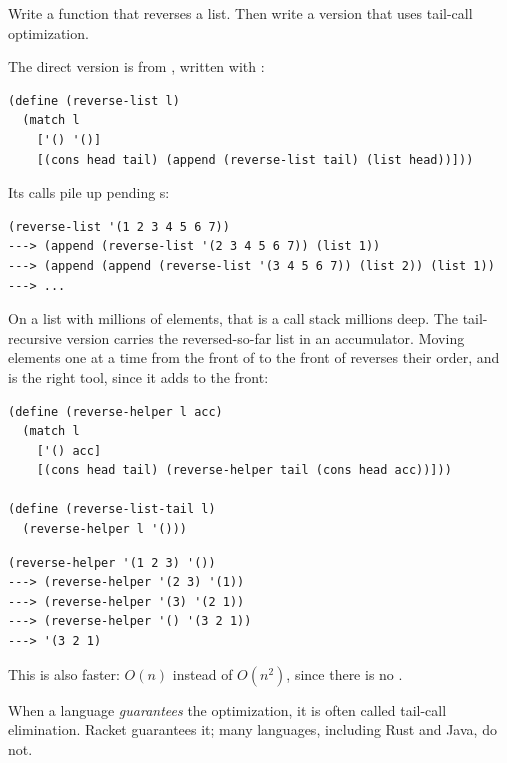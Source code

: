 \begin{exercise}
Write a function that reverses a list. Then write a version that uses tail-call optimization.
\end{exercise}
\begin{solution}
The direct version is  from , written with :
\begin{lstlisting}
(define (reverse-list l)
  (match l
    ['() '()]
    [(cons head tail) (append (reverse-list tail) (list head))]))
\end{lstlisting}
Its calls pile up pending s:
\begin{lstlisting}[style=repl]
(reverse-list '(1 2 3 4 5 6 7))
---> (append (reverse-list '(2 3 4 5 6 7)) (list 1))
---> (append (append (reverse-list '(3 4 5 6 7)) (list 2)) (list 1))
---> ...
\end{lstlisting}
On a list with millions of elements, that is a call stack millions deep. The tail-recursive version carries the reversed-so-far list in an accumulator. Moving elements one at a time from the front of  to the front of  reverses their order, and  is the right tool, since it adds to the front:
\begin{lstlisting}
(define (reverse-helper l acc)
  (match l
    ['() acc]
    [(cons head tail) (reverse-helper tail (cons head acc))]))

(define (reverse-list-tail l)
  (reverse-helper l '()))
\end{lstlisting}
\begin{lstlisting}[style=repl]
(reverse-helper '(1 2 3) '())
---> (reverse-helper '(2 3) '(1))
---> (reverse-helper '(3) '(2 1))
---> (reverse-helper '() '(3 2 1))
---> '(3 2 1)
\end{lstlisting}
This is also faster: $O(n)$ instead of $O(n^2)$, since there is no .
\end{solution}

\begin{remark}
When a language \emph{guarantees} the optimization, it is often called tail-call elimination. Racket guarantees it; many languages, including Rust and Java, do not.
\end{remark}
